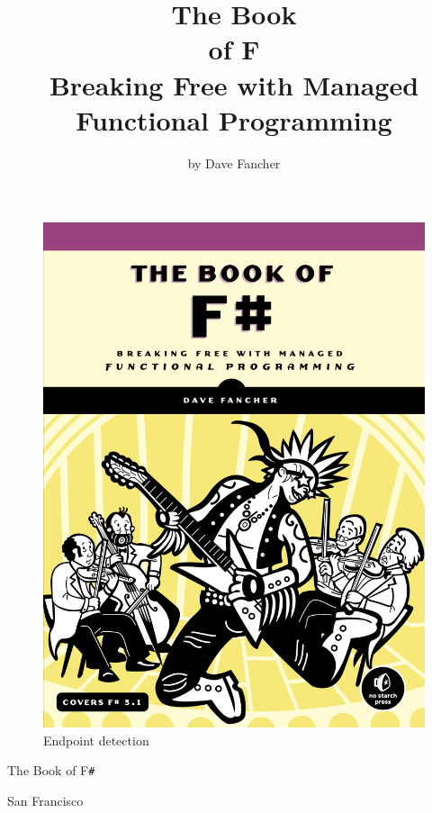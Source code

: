 \documentclass{book}
\begin{document}
\begin {figure}[H]
\centering
\includegraphics[width=\paperwidth,height=\paperheight]{../pic/cover.png}
\caption{Endpoint detection}
\end {figure}

The Book of F\verb|#|
\title{The Book\\of F\\Breaking Free with Managed \\Functional Programming}
\author{by Dave Fancher}
\maketitle


San Francisco
\end{document}
